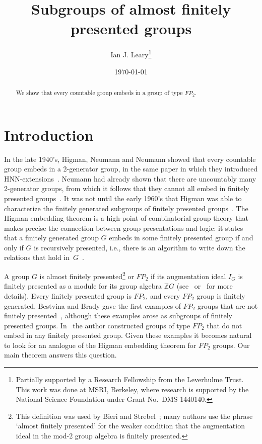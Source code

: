\documentclass[12pt,a4paper]{article}
\title{Subgroups of almost finitely presented groups}
\author{Ian J. Leary\thanks{Partially supported by a Research Fellowship 
from the Leverhulme Trust.  This work was done at MSRI, Berkeley, 
where research is supported by 
the National Science Foundation under Grant No.~DMS-1440140.}}
\date{\today}
\newcommand{\zz}{{\mathbb Z}}
\begin{document}
 

\maketitle

\begin{abstract} 
We show that every countable group embeds in a group of type $FP_2$. 
\end{abstract}


\section{Introduction} 

In the late 1940's, Higman, Neumann and Neumann showed that every 
countable group embeds in a 2-generator group, in the same paper 
in which they introduced HNN-extensions~\cite{hnn}.  Neumann had 
already shown that there are uncountably many 2-generator groups, 
from which it follows that they cannot all embed in finitely presented 
groups~\cite{neumann}.  It was not until the early 1960's that Higman 
was able to characterize the finitely generated subgroups of 
finitely presented groups~\cite{higman}.  The  
Higman embedding theorem is a high-point of combinatorial group
theory that makes precise the connection between group presentations
and logic: it states that a finitely generated group $G$ embeds in some 
finitely presented group if and only if $G$ is recursively presented, 
i.e., there is an algorithm to write down the relations that hold 
in~$G$~\cite{higman}.  

A group $G$ is almost finitely presented\footnote{This definition was 
used by Bieri and Strebel~\cite{bieristrebel}; many authors use the 
phrase `almost finitely presented' for the weaker condition that the 
augmentation ideal in the mod-2 group algebra is finitely presented.}  
or $FP_2$ if its augmentation 
ideal $I_G$ is finitely presented as a module for its group algebra
$\zz G$ (see~\cite[VIII.5]{brown} or~\cite{bieristrebel} for more details).  
Every finitely
presented group is $FP_2$, and every $FP_2$ group is finitely
generated.  Bestvina and Brady gave the first examples of $FP_2$
groups that are not finitely presented~\cite{BB}, although these
examples arose as subgroups of finitely presented groups.
In~\cite{ufp} the author constructed groups of type $FP_2$ that do not
embed in any finitely presented group.  Given these examples it
becomes natural to look for an analogue of the Higman embedding
theorem for $FP_2$ groups.  Our main theorem answers this question.
\end{document}
